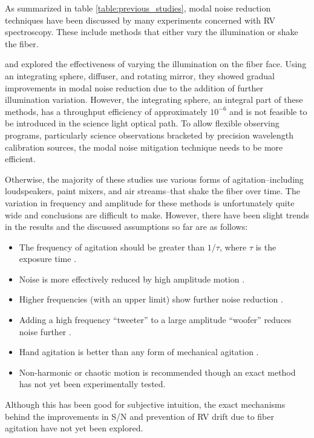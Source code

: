 \documentclass[twocolumn]{emulateapj}
\begin{document}
As summarized in table \ref{table:previous_studies}, modal noise reduction techniques have been discussed by many experiments concerned with RV spectroscopy. These include methods that either vary the illumination or shake the fiber.

\citet{Mahadevan2014} and \citet{Halverson2014} explored the effectiveness of varying the illumination on the fiber face. Using an integrating sphere, diffuser, and rotating mirror, they showed gradual improvements in modal noise reduction due to the addition of further illumination variation. However, the integrating sphere, an integral part of these methods, has a throughput efficiency of approximately $10^{-6}$ and is not feasible to be introduced in the science light optical path. To allow flexible observing programs, particularly science observations bracketed by precision wavelength calibration sources, the modal noise mitigation technique needs to be more efficient.

Otherwise, the majority of these studies use various forms of agitation--including loudspeakers, paint mixers, and air streams--that shake the fiber over time. The variation in frequency and amplitude for these methods is unfortunately quite wide and conclusions are difficult to make. However, there have been slight trends in the results and the discussed assumptions so far are as follows:
\begin{itemize}
\item The frequency of agitation should be greater than $1/\tau$, where $\tau$ is the exposure time \citep{Baudrand2001}.
\item Noise is more effectively reduced by high amplitude motion \citep{Lemke2011, McCoy2012}.
\item Higher frequencies (with an upper limit) show further noise reduction \citep{Lemke2011}.
\item Adding a high frequency ``tweeter'' to a large amplitude ``woofer'' reduces noise further \citep{Plavchan2013}.
\item Hand agitation is better than any form of mechanical agitation \citep{Lemke2011, McCoy2012, Mahadevan2014, Roy2014}.
\item Non-harmonic or chaotic motion is recommended \citep{Grupp2003} though an exact method has not yet been experimentally tested.
\end{itemize}
Although this has been good for subjective intuition, the exact mechanisms behind the improvements in S/N and prevention of RV drift due to fiber agitation have not yet been explored.
\end{document}
